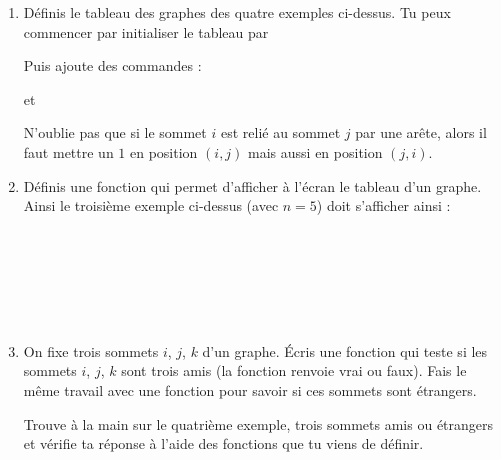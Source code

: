 \documentclass[11pt,class=report,crop=false]{standalone}
\begin{document}
\begin{activite}
\begin{enumerate}
  \item Définis le tableau des graphes des quatre exemples ci-dessus.
  Tu peux commencer par initialiser le tableau par 
  
  \centerline{}
  
  Puis ajoute des commandes :
  
  \centerline{ \quad et \quad {}}
  
  N'oublie pas que si le sommet $i$ est relié au sommet $j$ par une arête, alors il faut mettre un $1$ en position $(i,j)$ mais aussi en position $(j,i)$. 
  
  \item Définis une fonction  qui permet d'afficher à l'écran le tableau d'un graphe.
  Ainsi le troisième exemple ci-dessus (avec $n=5$) doit s'afficher ainsi :
\begin{center}
\\
\\
\\
\\
\\
\end{center}

  \item On fixe trois sommets $i$, $j$, $k$ d'un graphe. Écris une fonction  qui teste si les sommets $i$, $j$, $k$ sont trois amis (la fonction renvoie \og{}vrai\fg{} ou \og{}faux\fg{}). Fais le même travail avec une fonction  pour savoir si ces sommets sont étrangers.
  
Trouve à la main sur le quatrième exemple, trois sommets amis ou étrangers et vérifie ta réponse à l'aide des fonctions que tu viens de définir.

\end{enumerate}   
     
\end{activite}


\end{document}
